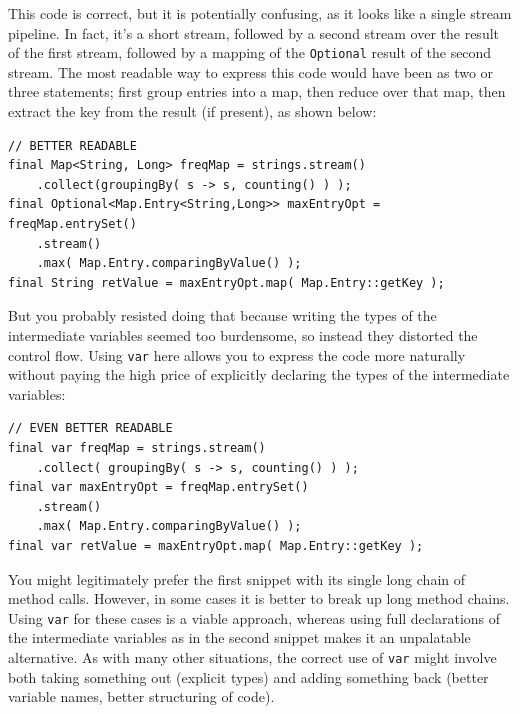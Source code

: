 \begin{itemize}
{This code is correct, but it is potentially confusing, as it looks like a single stream pipeline. In fact, it’s a short stream, followed by a second stream over the result of the first stream, followed by a mapping of the \lstinline|Optional|\autocite{ORACLE_DOC_OPTIONAL_CLASS} result of the second stream. The most readable way to express this code would have been as two or three statements; first group entries into a map, then reduce over that map, then extract the key from the result (if present), as shown below:
\begin{lstlisting}
// BETTER READABLE
final Map<String, Long> freqMap = strings.stream()
    .collect(groupingBy( s -> s, counting() ) );
final Optional<Map.Entry<String,Long>> maxEntryOpt = freqMap.entrySet()
    .stream()
    .max( Map.Entry.comparingByValue() );
final String retValue = maxEntryOpt.map( Map.Entry::getKey );
\end{lstlisting}

But you probably resisted doing that because writing the types of the intermediate variables seemed too burdensome, so instead they distorted the control flow. Using \lstinline|var| here allows you to express the code more naturally without paying the high price of explicitly declaring the types of the intermediate variables:
\begin{lstlisting}
// EVEN BETTER READABLE
final var freqMap = strings.stream()
    .collect( groupingBy( s -> s, counting() ) );
final var maxEntryOpt = freqMap.entrySet()
    .stream()
    .max( Map.Entry.comparingByValue() );
final var retValue = maxEntryOpt.map( Map.Entry::getKey );
\end{lstlisting}

You might legitimately prefer the first snippet with its single long chain of method calls. However, in some cases it is better to break up long method chains. Using \lstinline|var| for these cases is a viable approach, whereas using full declarations of the intermediate variables as in the second snippet makes it an unpalatable alternative. As with many other situations, the correct use of \lstinline|var| might involve both taking something out (explicit types) and adding something back (better variable names, better structuring of code).}
\end{itemize}

